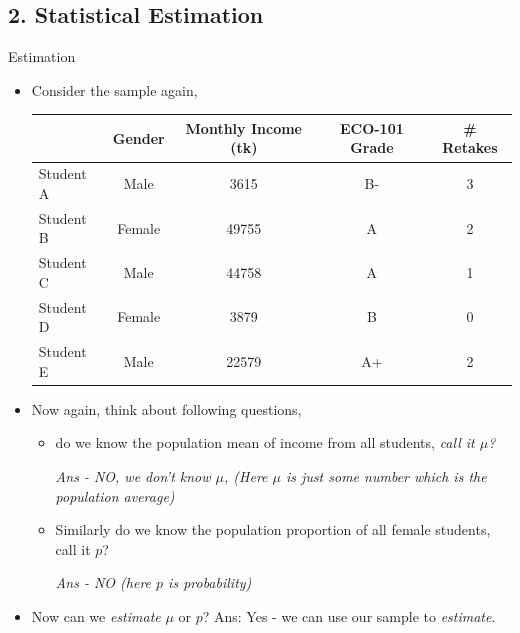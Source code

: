 \documentclass[8pt, usepdftitle=false]{beamer}
\begin{document}
\subsection{2. Statistical Estimation}
\frame{\subsectionpage}

\begin{frame}[allowframebreaks]{Estimation}
   
\begin{itemize}
   \item Consider the sample again,

      \medskip
      \begin{tabular}{l|c|c|c|c}
      \hline
       & Gender & Monthly Income (tk) & ECO-101 Grade & \# Retakes\\
      \hline
      Student A & Male & 3615 & B- & 3\\
      \hline
      Student B & Female & 49755 & A & 2\\
      \hline
      Student C & Male & 44758 & A & 1\\
      \hline
      Student D & Female & 3879 & B & 0\\
      \hline
      Student E & Male & 22579 & A+ & 2 \\
      \hline
      \end{tabular}



    \item Now again, think about following questions,

    \begin{itemize}
       \item do we know the \alert{population mean of income} from all students, \emph{call it $\mu$?} 

       \medskip

           \emph{Ans - NO, we don't know $\mu$, (Here $\mu$ is just some number which is the population average)}
      \medskip

      \item  Similarly  do we know the \alert{population proportion of all female students}, call it $p$? 

      \medskip
      \emph{Ans - NO (here $p$ is probability)}
      \medskip 


    \end{itemize}



  \item Now can we \emph{estimate}  $\mu$ or $p$? Ans: Yes - we can use our sample to \emph{estimate}. 


\end{itemize}
\end{frame}
\end{document}
